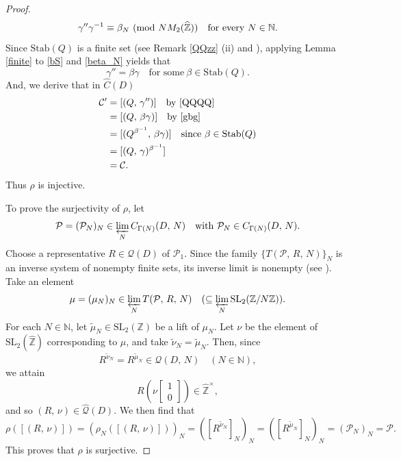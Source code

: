 \documentclass[reqno,11pt]{article}
\newcommand{\Mod}[1]{\ (\textup{mod}\ #1)}
\theoremstyle{plain} %
\theoremstyle{definition} %
\begin{document}
\begin{proof}
\begin{equation}\label{beta_N}
\gamma''\gamma^{-1}\equiv\beta_N\Mod{NM_2(\widehat{\mathbb{Z}})}
\quad\text{for every}~N\in\mathbb{N}. 
\end{equation}
Since $\mathrm{Stab}(Q)$ is a finite set (see 
Remark \ref{QQzz} (ii) and \cite[Proposition 1.5 in Chapter I]{Silverman}),
applying Lemma \ref{finite} to \eqref{bS} and \eqref{beta_N} yields that
\begin{equation}\label{gbg}
\gamma''=\beta\gamma\quad\text{for some}~\beta\in\mathrm{Stab}(Q). 
\end{equation} 
And, we derive that in $\widehat{C}(D)$
\begin{align*}
\mathcal{C}'&=[(Q,\,\gamma'')]\quad\text{by \eqref{QQQQ}}\\
&=[(Q,\,\beta\gamma)]\quad\text{by \eqref{gbg}}\\
&=[(Q^{\beta^{-1}},\,\beta\gamma)]\quad\text{since}~\beta\in\mathrm{Stab}(Q)\\
&=[(Q,\,\gamma)^{\beta^{-1}}]\\
&=\mathcal{C}. 
\end{align*}
Thus $\rho$ is injective.
\par
To prove the surjectivity of $\rho$, let 
\begin{equation*}
\mathcal{P}=(\mathcal{P}_N)_N\in\varprojlim_N C_{\Gamma(N)}(D,\,N)\quad\text{with}~
\mathcal{P}_N\in C_{\Gamma(N)}(D,\,N). 
\end{equation*}
Choose a representative $R\in\mathcal{Q}(D)$ of $\mathcal{P}_1$.
Since the family $\{T(\mathcal{P},\,R,\,N)\}_N$
is an inverse system of nonempty finite sets,
its inverse limit is nonempty (see \cite[Theorem 111]{I-M}). 
Take an element 
\begin{equation*}
\mu=(\mu_N)_N\in\varprojlim_N T(\mathcal{P},\,R,\,N)\quad(\subseteq\varprojlim_N\mathrm{SL}_2(\mathbb{Z}/N\mathbb{Z})).
\end{equation*}
For each $N\in\mathbb{N}$, let $\widetilde{\mu}_N\in\mathrm{SL}_2(\mathbb{Z})$ be
a lift of $\mu_N$. 
Let $\nu$ be the element of $\mathrm{SL}_2(\widehat{\mathbb{Z}})$ 
corresponding to $\mu$, and take $\widetilde{\nu}_N=\widetilde{\mu}_N$. 
Then, since
\begin{equation*}
R^{\widetilde{\nu}_N}
=R^{\widetilde{\mu}_N}\in\mathcal{Q}(D,\,N)\quad(N\in\mathbb{N}),
\end{equation*}
we attain 
\begin{equation*}
R\left(\nu\begin{bmatrix}1\\0\end{bmatrix}\right)\in\widehat{\mathbb{Z}}^\times, 
\end{equation*}
and so $(R,\,\nu)\in\widehat{\mathcal{Q}}(D)$. We then find that
\begin{equation*}
\rho([(R,\,\nu)])=(\rho_N([(R,\,\nu)]))_N
=([R^{\widetilde{\nu}_N}]_N)_N
=([R^{\widetilde{\mu}_N}]_N)_N
=(\mathcal{P}_N)_N
=\mathcal{P}. 
\end{equation*}
This proves that $\rho$ is surjective. 
\end{proof}
\end{document}
